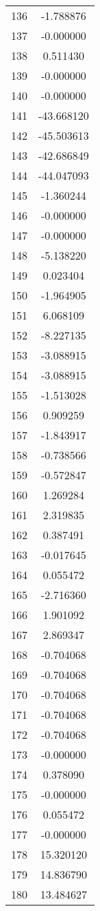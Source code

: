 \documentclass[12pt]{article}
\begin{document}
\begin{longtable}{@{}cc@{}}
136 & -1.788876 \\
137 & -0.000000 \\
138 & 0.511430 \\
139 & -0.000000 \\
140 & -0.000000 \\
141 & -43.668120 \\
142 & -45.503613 \\
143 & -42.686849 \\
144 & -44.047093 \\
145 & -1.360244 \\
146 & -0.000000 \\
147 & -0.000000 \\
148 & -5.138220 \\
149 & 0.023404 \\
150 & -1.964905 \\
151 & 6.068109 \\
152 & -8.227135 \\
153 & -3.088915 \\
154 & -3.088915 \\
155 & -1.513028 \\
156 & 0.909259 \\
157 & -1.843917 \\
158 & -0.738566 \\
159 & -0.572847 \\
160 & 1.269284 \\
161 & 2.319835 \\
162 & 0.387491 \\
163 & -0.017645 \\
164 & 0.055472 \\
165 & -2.716360 \\
166 & 1.901092 \\
167 & 2.869347 \\
168 & -0.704068 \\
169 & -0.704068 \\
170 & -0.704068 \\
171 & -0.704068 \\
172 & -0.704068 \\
173 & -0.000000 \\
174 & 0.378090 \\
175 & -0.000000 \\
176 & 0.055472 \\
177 & -0.000000 \\
178 & 15.320120 \\
179 & 14.836790 \\
180 & 13.484627 \\

\end{longtable}
\end{document}
